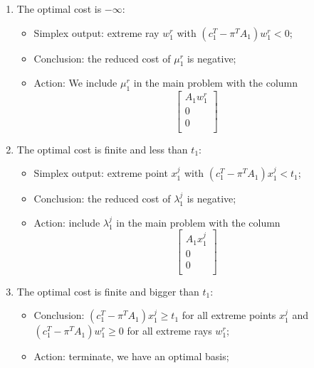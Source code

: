 \documentclass[12pt, openany]{report}
\theoremstyle{definition}
\begin{document}
\begin{enumerate}
	\item The optimal cost is $-\infty$:
	\begin{itemize}
		\item Simplex output: extreme ray $w_1^r$ with $(c_1^T-\pi^TA_1)w_1^r<0$;
		\item Conclusion: the reduced cost of $\mu_1^r$ is negative;
		\item Action: We include $\mu_1^r$ in the main problem with the column
		\begin{equation}
			\begin{bmatrix}
				A_1w_1^r\\ 0 \\ 0\\
			\end{bmatrix}
		\end{equation}
	\end{itemize}
	\item The optimal cost is finite and less than $t_1$:
	\begin{itemize}
		\item Simplex output: extreme point $x_1^j$ with $(c_1^T-\pi^TA_1)x_1^j < t_1$;
		\item Conclusion: the reduced cost of $\lambda_1^j$ is negative;
		\item Action: include $\lambda_1^j$ in the main problem with the column 
		\begin{equation}
			\begin{bmatrix}
				A_1x_1^j \\ 0 \\0 \\
			\end{bmatrix}
		\end{equation}
	\end{itemize}
	\item The optimal cost is finite and bigger than $t_1$:
	\begin{itemize}
		\item Conclusion: $(c_1^T-\pi^TA_1)x_1^j\ge t_1$ for all extreme points $x_1^j$ and $(c_1^T-\pi^TA_1)w_1^r\ge 0$ for all extreme rays $w_1^r$;
		\item Action: terminate, we have an optimal basis;
	\end{itemize}
\end{enumerate}
\end{document}
